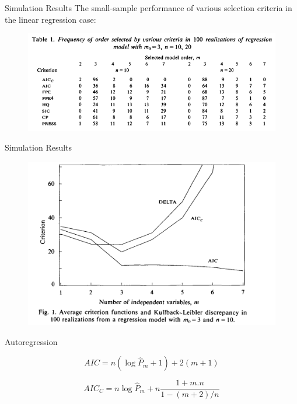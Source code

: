 \documentclass[11pt]{beamer}
\begin{document}
\begin{frame}{Simulation Results}
The small-sample performance of various selection criteria in the linear
regression case:
    \begin{figure}[htb]
        \centering
        \includegraphics[width=1\textwidth]{drive.google.com_file_d_15QZ0OuCAEpjZRO1xj0kAWJdI5QHMy-5W_view (1)}
        \medskip
    \end{figure}
\end{frame}

\begin{frame}{Simulation Results}
\begin{figure}[htb]
        \centering
        \includegraphics[width=1\textwidth]{drive.google.com_file_d_15QZ0OuCAEpjZRO1xj0kAWJdI5QHMy-5W_view (2)}
        \medskip
    \end{figure}

\end{frame}

\begin{frame}{Autoregression}
\begin{block}
$$AIC = n(\log \hat P_m +1)+2(m+1)$$
\end{block}

\begin{block}
$$AIC_C = n\log \hat P_m +n\frac{1+m.n}{1-(m+2)/n}$$
\end{block}

\end{frame}
\end{document}
